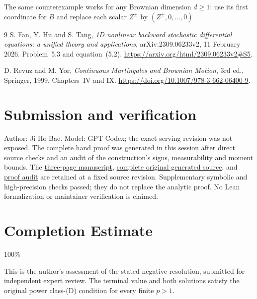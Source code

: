 \documentclass[11pt]{article}
\begin{document}
The same counterexample works for any Brownian dimension $d\ge1$:
use its first coordinate for $B$ and replace each scalar $Z^\pm$ by
$(Z^\pm,0,\ldots,0)$.

\begin{thebibliography}{9}
S. Fan, Y. Hu and S. Tang,
\emph{1D nonlinear backward stochastic differential equations:
a unified theory and applications}, arXiv:2309.06233v2,
11 February 2026. Problem~5.3 and equation~(5.2).
\url{https://arxiv.org/html/2309.06233v2#S5}.

D. Revuz and M. Yor,
\emph{Continuous Martingales and Brownian Motion},
3rd ed., Springer, 1999. Chapters~IV and IX.
\url{https://doi.org/10.1007/978-3-662-06400-9}.
\end{thebibliography}
\section*{Submission and verification}
Author: Ji Ho Bae. Model: GPT Codex; the exact serving revision was not exposed.
The complete hand proof was generated in this session after direct source
checks and an audit of the construction's signs, measurability and moment bounds.
The \href{https://github.com/jbaelaw/oscillatory-bsde-nonuniqueness/blob/071cfc26010f9d3b059f374b8211f3adb628c18c/paper/Proof.pdf}{three-page manuscript},
\href{https://github.com/jbaelaw/oscillatory-bsde-nonuniqueness/blob/071cfc26010f9d3b059f374b8211f3adb628c18c/paper/Proof.tex}{complete original generated source}, and
\href{https://github.com/jbaelaw/oscillatory-bsde-nonuniqueness/blob/071cfc26010f9d3b059f374b8211f3adb628c18c/verification/ProofAudit.md}{proof audit} are retained at a fixed source revision.
Supplementary symbolic and high-precision checks passed; they do not replace
the analytic proof. No Lean formalization or maintainer verification is claimed.

\section{Completion Estimate}
100\%

This is the author's assessment of the stated negative resolution, submitted
for independent expert review. The terminal value and both solutions satisfy
the original power class-(D) condition for every finite $p>1$.
\end{document}
